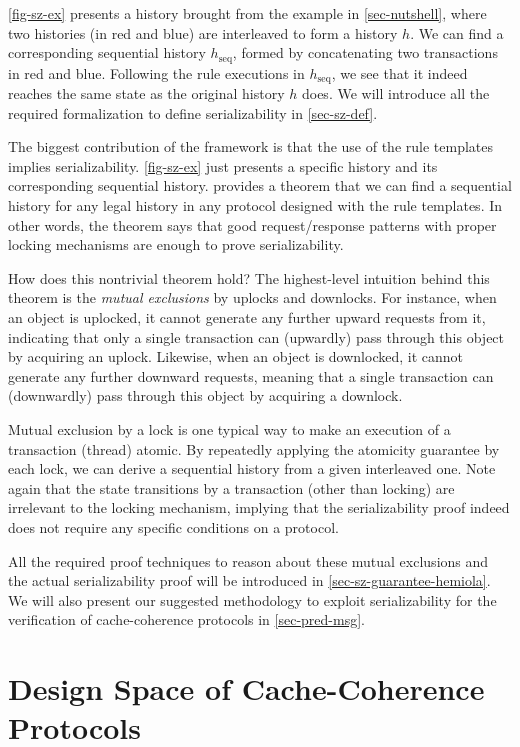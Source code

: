\autoref{fig-sz-ex} presents a history brought from the example in \autoref{sec-nutshell}, where two histories (in {\color{myred} red} and {\color{myblue} blue}) are interleaved to form a history $h$.
We can find a corresponding sequential history $h_{\textrm{seq}}$, formed by concatenating two transactions in {\color{myred} red} and {\color{myblue} blue}.
Following the rule executions in $h_{\textrm{seq}}$, we see that it indeed reaches the same state as the original history $h$ does.
We will introduce all the required formalization to define serializability in \autoref{sec-sz-def}.

The biggest contribution of the \hemiola{} framework is that the use of the rule templates implies serializability.
\autoref{fig-sz-ex} just presents a specific history and its corresponding sequential history.
\hemiola{} provides a theorem that we can find a sequential history for any legal history in any protocol designed with the rule templates.
In other words, the theorem says that good request/response patterns with proper locking mechanisms are enough to prove serializability.

How does this nontrivial theorem hold?
The highest-level intuition behind this theorem is the \emph{mutual exclusions} by uplocks and downlocks.
For instance, when an object is uplocked, it cannot generate any further upward requests from it, indicating that only a single transaction can (upwardly) pass through this object by acquiring an uplock.
Likewise, when an object is downlocked, it cannot generate any further downward requests, meaning that a single transaction can (downwardly) pass through this object by acquiring a downlock.

Mutual exclusion by a lock is one typical way to make an execution of a transaction (thread) atomic.
By repeatedly applying the atomicity guarantee by each lock, we can derive a sequential history from a given interleaved one.
Note again that the state transitions by a transaction (other than locking) are irrelevant to the locking mechanism, implying that the serializability proof indeed does not require any specific conditions on a protocol.

All the required proof techniques to reason about these mutual exclusions and the actual serializability proof will be introduced in \autoref{sec-sz-guarantee-hemiola}.
We will also present our suggested methodology to exploit serializability for the verification of cache-coherence protocols in \autoref{sec-pred-msg}.

\section{Design Space of Cache-Coherence Protocols}
\label{sec-design-space}

